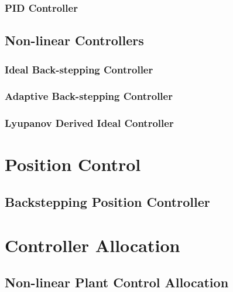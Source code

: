 \subsubsection{PID Controller}
\subsection{Non-linear Controllers}
\label{subsec:control.attitude.nonlinear}
\subsubsection{Ideal Back-stepping Controller}
\subsubsection{Adaptive Back-stepping Controller}
\subsubsection{Lyupanov Derived Ideal Controller}

\section{Position Control}
\label{sec:control.position}
\subsection{Backstepping Position Controller}
\label{subsec:control.position.bacstepping}

\section{Controller Allocation}
\label{sec:control.allocation}
\subsection{Non-linear Plant Control Allocation}
\label{subsec:control.allocation.allocators}
